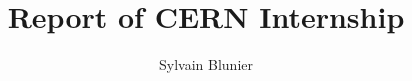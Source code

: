 \documentclass[a4paper,11pt]{article}
\begin{document}
\title{Report of CERN Internship} %

\author{Sylvain Blunier}

\maketitle




\end{document}
